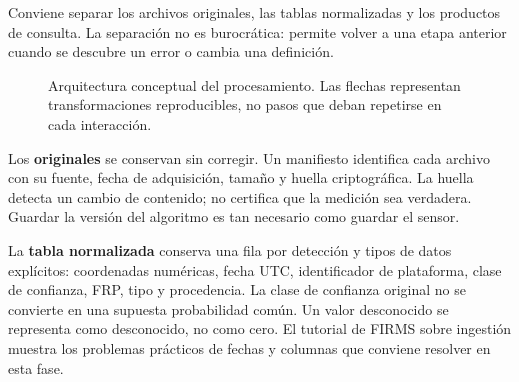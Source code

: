 Conviene separar los archivos originales, las tablas normalizadas y los productos de
consulta. La separación no es burocrática: permite volver a una etapa anterior cuando
se descubre un error o cambia una definición.

\begin{figure}[ht]
\centering
{}
\caption{Arquitectura conceptual del procesamiento. Las flechas representan transformaciones
reproducibles, no pasos que deban repetirse en cada interacción.}
\label{fig:arquitectura}
\end{figure}

Los \textbf{originales} se conservan sin corregir. Un manifiesto identifica cada archivo con
su fuente, fecha de adquisición, tamaño y huella criptográfica. La huella detecta un cambio
de contenido; no certifica que la medición sea verdadera. Guardar la versión del algoritmo
es tan necesario como guardar el sensor.

La \textbf{tabla normalizada} conserva una fila por detección y tipos de datos explícitos:
coordenadas numéricas, fecha UTC, identificador de plataforma, clase de confianza, FRP,
tipo y procedencia. La clase de confianza original no se convierte en una supuesta
probabilidad común. Un valor desconocido se representa como desconocido, no como cero.
El tutorial de FIRMS sobre ingestión muestra los problemas prácticos de fechas y columnas
que conviene resolver en esta fase.

